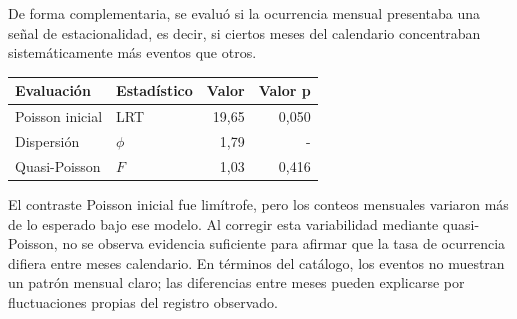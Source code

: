 \documentclass[
  spanish,
  letterpaper,
  DIV=11,
  numbers=noendperiod]{scrartcl}
\begin{document}
\noindent
\begin{minipage}[t]{0.45\textwidth}
\vspace{0pt}
De forma complementaria, se evaluó si la ocurrencia mensual presentaba una señal de estacionalidad, es decir, si ciertos meses del calendario concentraban sistemáticamente más eventos que otros.
\end{minipage}\hfill
\begin{minipage}[t]{0.51\textwidth}
\vspace{0pt}
\begingroup
\scriptsize
\centering
\setlength{\tabcolsep}{3.0pt}
\renewcommand{\arraystretch}{0.82}
{}
\label{tbl-temporal-estacionalidad-mensual}
\hypertarget{dest-tbl-temporal-estacionalidad-mensual}{}
\begin{tabular*}{\linewidth}{@{\extracolsep{\fill}}llrr@{}}
\toprule
Evaluación & Estadístico & Valor & Valor p \\
\midrule
Poisson inicial & LRT & 19,65 & 0,050 \\
Dispersión & $\phi$ & 1,79 & - \\
Quasi-Poisson & $F$ & 1,03 & 0,416 \\
\bottomrule
\end{tabular*}
\par\vspace{0.10em}
\endgroup
\end{minipage}
\par\vspace{-0.25em}

El contraste Poisson inicial fue limítrofe, pero los conteos mensuales
variaron más de lo esperado bajo ese modelo. Al corregir esta
variabilidad mediante quasi-Poisson, no se observa evidencia suficiente
para afirmar que la tasa de ocurrencia difiera entre meses calendario.
En términos del catálogo, los eventos no muestran un patrón mensual
claro; las diferencias entre meses pueden explicarse por fluctuaciones
propias del registro observado.
\end{document}
